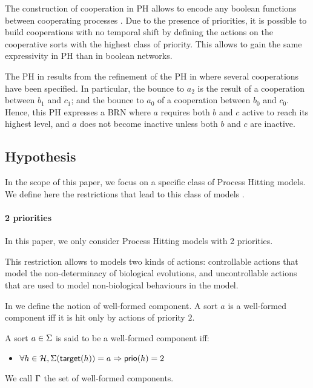 The construction of cooperation in PH allows to encode any boolean functions between cooperating processes \cite{PMR10-TCSB}.
Due to the presence of priorities, it is possible to build cooperations with no temporal shift by defining the actions on the cooperative sorts with the highest class of priority.
This allows to gain the same expressivity in PH than in boolean networks.

\begin{example}
The PH in  results from the refinement of the PH in 
where several cooperations have been specified.
In particular, the bounce to $a_2$ is the result of a cooperation between $b_1$ and $c_1$; and the
bounce to $a_0$ of a cooperation between $b_0$ and $c_0$.
Hence, this PH expresses a BRN where $a$ requires both $b$ and $c$ active to reach its
highest level, and $a$ does not become inactive unless both $b$ and $c$ are inactive.
\end{example}

\subsection{Hypothesis} 
\label{ssec:hypothesis}

In the scope of this paper, we focus on a specific class of Process Hitting models.
We define here the restrictions that lead to this class of models .

\paragraph{2 priorities}
In this paper, we only consider Process Hitting models with 2 priorities.

This restriction allows to models two kinds of actions: controllable actions that model the non-determinacy of biological evolutions,
and uncontrollable actions that are used to model non-biological behaviours in the model.

In  we define the notion of well-formed component.
A sort $a$ is a well-formed component iff
it is hit only by actions of priority $2$.
\begin{definition}
\label{def:component}
  A sort $a \in \Sigma$ is said to be a well-formed component iff:
  \begin{itemize}
    \item $\forall h \in \mathcal{H}, \Sigma(\mathsf{target}(h)) = a \Rightarrow \mathsf{prio}(h) = 2$
  \end{itemize}
\end{definition}
We call $\Gamma$ the set of well-formed components.

